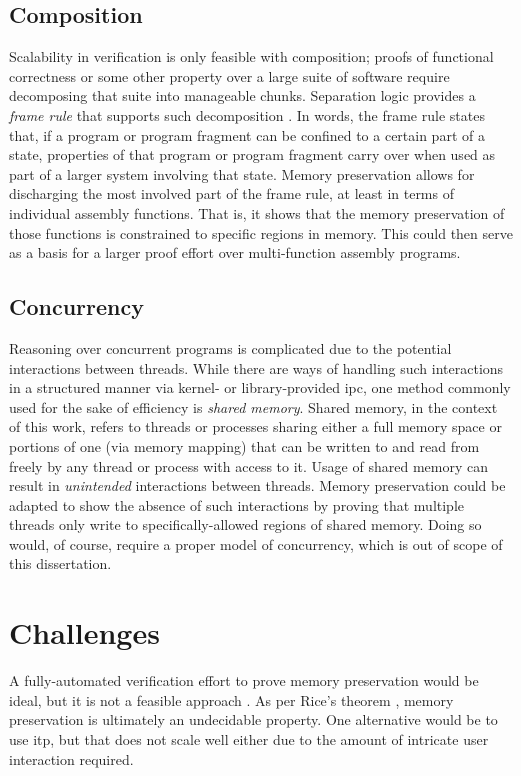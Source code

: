 \subsection{Composition}\label{sse:composition}
Scalability in verification is only feasible with composition;
proofs of functional correctness or some other property over a large suite of software
require decomposing that suite into manageable chunks.
Separation logic provides a \emph{frame rule} that supports such%
decomposition \autocite{o2001local,reynolds2002separation,krebbers2017essence}.
In words, the frame rule states that,
if a program or program fragment can be confined to a certain part of a state,
properties of that program or program fragment carry over
when used as part of a larger system involving that state.
Memory preservation allows for discharging the most involved part of the frame rule,
at least in terms of individual assembly functions.
That is, it shows that the memory preservation of those functions is constrained
to specific regions in memory.
This could then serve as a basis
for a larger proof effort over multi-function assembly programs.

\subsection{Concurrency}
Reasoning over concurrent programs is complicated
due to the potential interactions between threads.
While there are ways of handling such interactions in a structured manner
via kernel- or library-provided \ac{ipc},
one method commonly used for the sake of efficiency is \emph{shared memory}.
Shared memory, in the context of this work,
refers to threads or processes sharing either a full memory space
or portions of one (via memory mapping)
that can be written to and read from freely by any thread or process with access to it.
Usage of shared memory can result in \emph{unintended} interactions between threads.
Memory preservation could be adapted to show the absence of such interactions
by proving that multiple threads only write
to specifically-allowed regions of shared memory.
Doing so would, of course, require a proper model of concurrency,
which is out of scope of this dissertation.

\section{Challenges}
A fully-automated verification effort to prove memory preservation would be ideal,
but it is not a feasible approach \autocite{ouimet2008formal}.
As per Rice's theorem \autocite{rice1953classes},
memory preservation is ultimately an undecidable property.
One alternative would be to use \ac{itp}, but that does not scale well either
due to the amount of intricate user interaction required.

